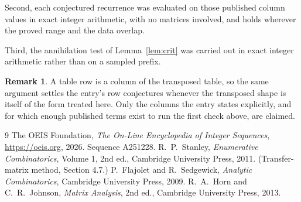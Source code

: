 \documentclass[11pt,a4paper]{article}
\theoremstyle{plain}
\theoremstyle{definition}
\newtheorem{remark}[theorem]{Remark}
\begin{document}
Second, each conjectured recurrence was evaluated on those published column values in exact
integer arithmetic, with no matrices involved, and holds wherever the proved range and the
data overlap.

Third, the annihilation test of Lemma~\ref{lem:crit} was carried out in exact integer
arithmetic rather than on a sampled prefix.

\begin{remark}
A table row is a column of the transposed table, so the same argument settles the entry's row
conjectures whenever the transposed shape is itself of the form treated here. Only the columns
the entry states explicitly, and for which enough published terms exist to run the first check
above, are claimed.
\end{remark}

\begin{thebibliography}{9}
 The OEIS Foundation, \emph{The On-Line Encyclopedia of Integer
Sequences}, \url{https://oeis.org}, 2026. Sequence A251228.
 R.~P.~Stanley, \emph{Enumerative Combinatorics}, Volume 1, 2nd ed.,
Cambridge University Press, 2011. (Transfer-matrix method, Section 4.7.)
 P.~Flajolet and R.~Sedgewick, \emph{Analytic Combinatorics}, Cambridge
University Press, 2009.
 R.~A.~Horn and C.~R.~Johnson, \emph{Matrix Analysis}, 2nd ed., Cambridge
University Press, 2013.
\end{thebibliography}
\end{document}
